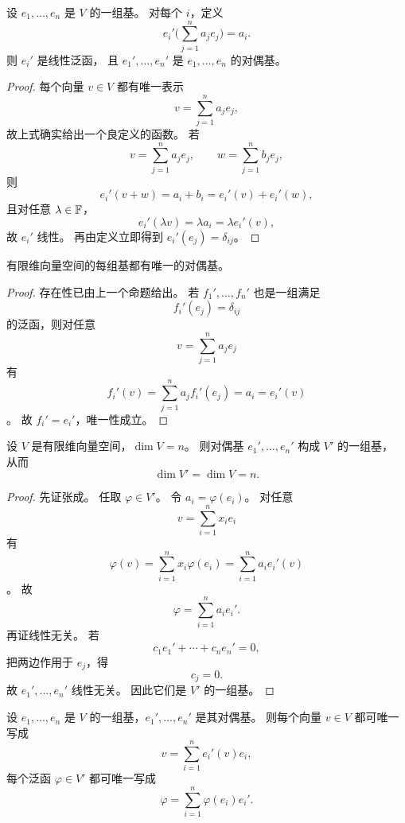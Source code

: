 \begin{proposition} 设 $e_1,\dots,e_n$ 是 $V$ 的一组基。 对每个 $i$，定义 \[ e_i'\Big(\sum_{j=1}^n a_j e_j\Big)=a_i. \] 则 $e_i'$ 是线性泛函， 且 $e_1',\dots,e_n'$ 是 $e_1,\dots,e_n$ 的对偶基。 \end{proposition}




\begin{proof} 每个向量 $v\in V$ 都有唯一表示 \[ v=\sum_{j=1}^n a_j e_j, \] 故上式确实给出一个良定义的函数。 若 \[ v=\sum_{j=1}^n a_j e_j,\qquad w=\sum_{j=1}^n b_j e_j, \] 则 \[ e_i'(v+w)=a_i+b_i=e_i'(v)+e_i'(w), \] 且对任意 $\lambda\in\mathbb{F}$， \[ e_i'(\lambda v)=\lambda a_i=\lambda e_i'(v), \] 故 $e_i'$ 线性。 再由定义立即得到 $e_i'(e_j)=\delta_{ij}$。 \end{proof}




\begin{theorem} 有限维向量空间的每组基都有唯一的对偶基。 \end{theorem}




\begin{proof} 存在性已由上一个命题给出。 若 $f_1',\dots,f_n'$ 也是一组满足 \[ f_i'(e_j)=\delta_{ij} \] 的泛函，则对任意 \[ v=\sum_{j=1}^n a_j e_j \] 有 \[ f_i'(v)=\sum_{j=1}^n a_j f_i'(e_j)=a_i=e_i'(v) \]。 故 $f_i'=e_i'$，唯一性成立。 \end{proof}




\begin{theorem} 设 $V$ 是有限维向量空间，$\dim V=n$。 则对偶基 $e_1',\dots,e_n'$ 构成 $V'$ 的一组基， 从而 \[ \dim V'=\dim V=n. \] \end{theorem}




\begin{proof} 先证张成。 任取 $\varphi\in V'$。 令 $a_i=\varphi(e_i)$。 对任意 \[ v=\sum_{i=1}^n x_i e_i \] 有 \[ \varphi(v)=\sum_{i=1}^n x_i\varphi(e_i) =\sum_{i=1}^n a_i e_i'(v) \]。 故 \[ \varphi=\sum_{i=1}^n a_i e_i'. \] 再证线性无关。 若 \[ c_1e_1'+\cdots+c_ne_n'=0, \] 把两边作用于 $e_j$，得 \[ c_j=0. \] 故 $e_1',\dots,e_n'$ 线性无关。 因此它们是 $V'$ 的一组基。 \end{proof}




\begin{corollary} 设 $e_1,\dots,e_n$ 是 $V$ 的一组基，$e_1',\dots,e_n'$ 是其对偶基。 则每个向量 $v\in V$ 都可唯一写成 \[ v=\sum_{i=1}^n e_i'(v)e_i, \] 每个泛函 $\varphi\in V'$ 都可唯一写成 \[ \varphi=\sum_{i=1}^n \varphi(e_i)e_i'. \] \end{corollary}




